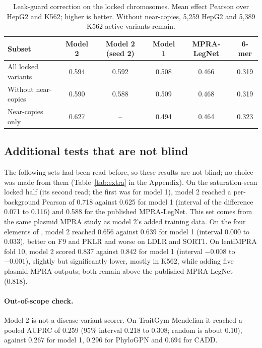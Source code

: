 \documentclass[11pt]{article}
\begin{document}
\begin{table}[tbp]
\centering
\caption{Leak-guard correction on the locked chromosomes. Mean effect Pearson over HepG2 and K562; higher is better. Without near-copies, 5,259 HepG2 and 5,389 K562 active variants remain.}
\label{tab:leak}
\footnotesize
\begin{tabular}{lccccc}
\toprule
Subset & Model 2 & Model 2 (seed 2) & Model 1 & MPRA-LegNet & 6-mer \\
\midrule
All locked variants & 0.594 & 0.592 & 0.508 & 0.466 & 0.319 \\
Without near-copies & 0.590 & 0.588 & 0.509 & 0.468 & 0.319 \\
Near-copies only & 0.627 & -- & 0.494 & 0.464 & 0.323 \\
\bottomrule
\end{tabular}
\end{table}

\subsection{Additional tests that are not blind}
\label{sec:extra}

The following sets had been read before, so these results are not blind; no choice was made from them (Table~\ref{tab:extra} in the Appendix). On the saturation-scan locked half (its second read; the first was for model 1), model 2 reached a per-background Pearson of 0.718 against 0.625 for model 1 (interval of the difference 0.071 to 0.116) and 0.588 for the published MPRA-LegNet. This set comes from the same plasmid MPRA study as model 2's added training data. On the four elements of \citet{kircher2019saturation}, model 2 reached 0.656 against 0.639 for model 1 (interval 0.000 to 0.033), better on F9 and PKLR and worse on LDLR and SORT1. On lentiMPRA fold 10, model 2 scored 0.837 against 0.842 for model 1 (interval $-0.008$ to $-0.001$), slightly but significantly lower, mostly in K562, while adding five plasmid-MPRA outputs; both remain above the published MPRA-LegNet (0.818).



\paragraph{Out-of-scope check.} Model 2 is not a disease-variant scorer. On TraitGym Mendelian it reached a pooled AUPRC of 0.259 (95\% interval 0.218 to 0.308; random is about 0.10), against 0.267 for model 1, 0.296 for PhyloGPN and 0.694 for CADD.
\end{document}
